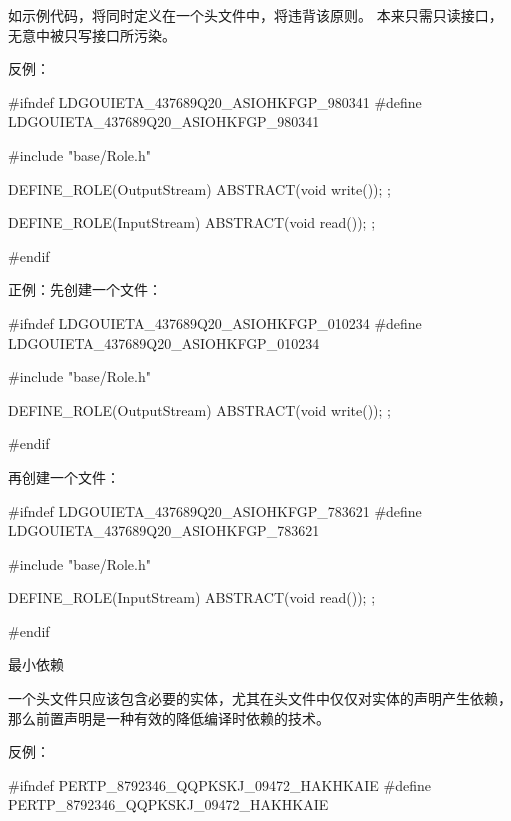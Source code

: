\begin{content}
如示例代码，将同时定义在一个头文件中，将违背该原则。
本来只需只读接口，无意中被只写接口所污染。

反例：
\begin{leftbar}
\begin{c++}[caption={io/Stream.h}]
#ifndef LDGOUIETA_437689Q20_ASIOHKFGP_980341
#define LDGOUIETA_437689Q20_ASIOHKFGP_980341

#include "base/Role.h"

DEFINE_ROLE(OutputStream)
{
    ABSTRACT(void write());
};

DEFINE_ROLE(InputStream)
{
    ABSTRACT(void read());
};

#endif
\end{c++}
\end{leftbar}

正例：先创建一个文件：
\begin{leftbar}
\begin{c++}[caption={io/OutputStream.h}]
#ifndef LDGOUIETA_437689Q20_ASIOHKFGP_010234
#define LDGOUIETA_437689Q20_ASIOHKFGP_010234
    
#include "base/Role.h"

DEFINE_ROLE(OutputStream)
{
    ABSTRACT(void write());
};

#endif
\end{c++}
\end{leftbar}

再创建一个文件：

\begin{leftbar}
\begin{c++}[caption={io/InputStream.h}]
#ifndef LDGOUIETA_437689Q20_ASIOHKFGP_783621
#define LDGOUIETA_437689Q20_ASIOHKFGP_783621

#include "base/Role.h"

DEFINE_ROLE(InputStream)
{
    ABSTRACT(void read());
};

#endif
\end{c++}
\end{leftbar}

\begin{principle}
最小依赖
\end{principle}

一个头文件只应该包含必要的实体，尤其在头文件中仅仅对实体的声明产生依赖，那么前置声明是一种有效的降低编译时依赖的技术。

反例：
\begin{leftbar}
\begin{c++}[caption={cppunit/Test.h}]
#ifndef PERTP_8792346_QQPKSKJ_09472_HAKHKAIE
#define PERTP_8792346_QQPKSKJ_09472_HAKHKAIE


\end{c++}
\end{leftbar}
\end{content}
